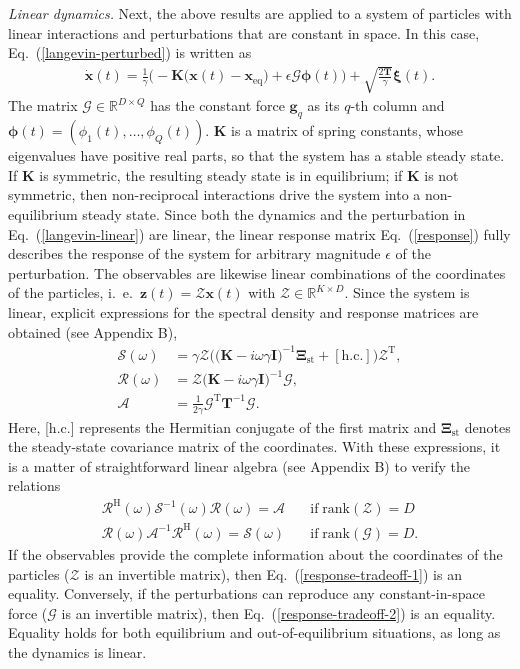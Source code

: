 \documentclass[aps,pre,twocolumn,superscriptaddress,notitlepage]{revtex4-2}
\newcommand{\nn}{\nonumber \\}
\newcommand{\n}{\nonumber}
\newcommand{\bmc}[1]{\bm{\mathcal{#1}}}
\renewcommand{\eqref}[1]{Eq.~(\ref{#1})}
\begin{document}
\textit{Linear dynamics.}
Next, the above results are applied to a system of particles with linear interactions and perturbations that are constant in space.
In this case, \eqref{langevin-perturbed} is written as
\begin{align}
\dot{\bm{x}}(t) = \frac{1}{\gamma} \Big(-\bm{K} \big(\bm{x}(t) - \bm{x}_\text{eq} \big) + \epsilon \bmc{G} \bm{\phi}(t) \Big)  + \sqrt{\frac{2 \bm{T}}{\gamma}} \bm{\xi}(t) \label{langevin-linear} .
\end{align}
The matrix $\bmc{G} \in \mathbb{R}^{D \times Q}$ has the constant force $\bm{g}_q$ as its $q$-th column and $\bm{\phi}(t) = (\phi_1(t),\ldots,\phi_Q(t))$.
$\bm{K}$ is a matrix of spring constants, whose eigenvalues have positive real parts, so that the system has a stable steady state.
If $\bm{K}$ is symmetric, the resulting steady state is in equilibrium; if $\bm{K}$ is not symmetric, then non-reciprocal interactions drive the system into a non-equilibrium steady state.
Since both the dynamics and the perturbation in \eqref{langevin-linear} are linear, the linear response matrix \eqref{response} fully describes the response of the system for arbitrary magnitude $\epsilon$ of the perturbation.
The observables are likewise linear combinations of the coordinates of the particles, i.~e.~$\bm{z}(t) = \bmc{Z} \bm{x}(t)$ with $\bmc{Z} \in \mathbb{R}^{K \times D}$.
Since the system is linear, explicit expressions for the spectral density and response matrices are obtained (see Appendix B),
\begin{align}
\bmc{S}(\omega) &= \gamma \bmc{Z} \Big( \big( \bm{K} - i \omega \gamma \bm{I} \big)^{-1} \bm{\Xi}_{\text{st}} + [\text{h.c.}] \Big) \bmc{Z}^\text{T}, \nn
\bmc{R}(\omega) &= \bmc{Z} \big( \bm{K} - i\omega \gamma \bm{I} \big)^{-1} \bmc{G} , \\
\bmc{A} &= \frac{1}{2 \gamma} \bmc{G}^\text{T} \bm{T}^{-1} \bmc{G} \n .
\end{align}
Here, [h.c.] represents the Hermitian conjugate of the first matrix and $\bm{\Xi}_\text{st}$ denotes the steady-state covariance matrix of the coordinates.
With these expressions, it is a matter of straightforward linear algebra (see Appendix B) to verify the relations
\begin{subequations}
\begin{align}
\bmc{R}^\text{H}(\omega) \bmc{S}^{-1}(\omega) \bmc{R}(\omega) = \bmc{A} \quad &\text{if} \; \text{rank}(\bmc{Z}) = D \label{linear-identity-1} \\
\bmc{R}(\omega) \bmc{A}^{-1} \bmc{R}^\text{H}(\omega) = \bmc{S}(\omega) \quad &\text{if} \; \text{rank}(\bmc{G}) = D \label{linear-identity-2}.
\end{align}\label{linear-identity}
\end{subequations}
If the observables provide the complete information about the coordinates of the particles ($\bmc{Z}$ is an invertible matrix), then \eqref{response-tradeoff-1} is an equality.
Conversely, if the perturbations can reproduce any constant-in-space force ($\bmc{G}$ is an invertible matrix), then \eqref{response-tradeoff-2} is an equality.
Equality holds for both equilibrium and out-of-equilibrium situations, as long as the dynamics is linear.
\end{document}
